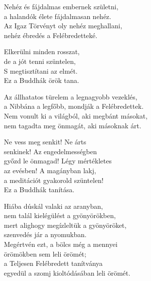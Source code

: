 \begin{dhpverse}

 Nehéz és fájdalmas embernek születni,\\
a halandók élete fájdalmasan nehéz.\\
Az Igaz Törvényt oly nehéz meghallani,\\
nehéz ébredés a Felébredetteké.

 Elkerülni minden rosszat,\\
de a jót tenni szüntelen,\\
S megtisztítani az elmét.\\
Ez a Buddhák örök tana.

 Az állhatatos türelem a legnagyobb vezeklés,\\
a Nibbána a legfőbb, mondják a Felébredettek.\\
Nem vonult ki a világból, aki megbánt másokat,\\
nem tagadta meg önmagát, aki másoknak árt.

 Ne vess meg senkit! Ne árts\\
senkinek! Az engedelmességben\\
győzd le önmagad! Légy mértékletes\\
az evésben! A magányban lakj,\\
a meditációt gyakorold szüntelen!\\
Ez a Buddhák tanítása.

 Hiába dúskál valaki az aranyban,\\
nem talál kielégülést a gyönyörökben,\\
mert alighogy megízleltük a gyönyöröket,\\
szenvedés jár a nyomukban.\\
Megértvén ezt, a bölcs még a mennyei\\
örömökben sem leli örömét;\\
a Teljesen Felébredett tanítványa\\
egyedül a szomj kioltódásában leli örömét.

\end{dhpverse}
\newpage
